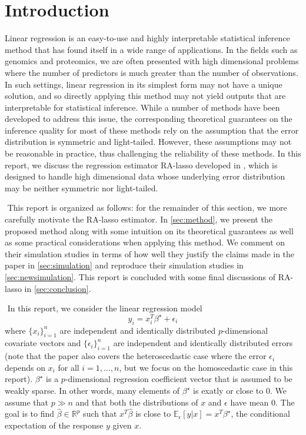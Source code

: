 

\section{Introduction}
Linear regression is an easy-to-use and highly interpretable statistical inference method that has found itself in a wide range of applications. In the fields such as genomics and proteomics, we are often presented with high dimensional problems where the number of predictors is much greater than the number of observations. In such settings, linear regression in its simplest form may not have a unique solution, and so directly applying this method may not yield outputs that are interpretable for statistical inference. While a number of methods have been developed to address this issue, the corresponding theoretical guarantees on the inference quality for most of these methods rely on the assumption that the error distribution is symmetric and light-tailed. However, these assumptions may not be reasonable in practice, thus challenging the reliability of these methods. In this report, we discuss the regression estimator RA-lasso developed in \citet{fan2017estimation}, which is designed to handle high dimensional data whose underlying error distribution may be neither symmetric nor light-tailed.

$ $\newline
This report is organized as follows: for the remainder of this section, we more carefully motivate the RA-lasso estimator. In \cref{sec:method}, we present the proposed method along with some intuition on its theoretical guarantees as well as some practical considerations when applying this method. We comment on their simulation studies in terms of how well they justify the claims made in the paper in \cref{sec:simulation} and reproduce their simulation studies in \cref{sec:newsimulation}. This report is concluded with some final discussions of RA-lasso in \cref{sec:conclusion}.

$ $\newline
In this report, we consider the linear regression model
\[
y_i = x_i^T\beta^\star + \epsilon_i
\]
where $\{x_i\}_{i=1}^n$ are independent and identically distributed $p$-dimensional covariate vectors and $\{\epsilon_i\}_{i=1}^n$ are independent and identically distributed errors (note that the paper also covers the heteroscedastic case where the error $\epsilon_i$ depends on $x_i$ for all $i=1,\dots,n$, but we focus on the homoscedastic case in this report). $\beta^\star$ is a $p$-dimensional regression coefficient vector that is assumed to be weakly sparse. In other words, many elements of $\beta^\star$ is exatly or close to $0$. We assume that $p \gg n$ and that both the distributions of $x$ and $\epsilon$ have mean $0$. The goal is to find $\hat{\beta}\in\mathbb{R}^p$ such that $x^T\hat{\beta}$ is close to $\mathbb{E}_{\epsilon}\left[ y | x \right] = x^T\beta^\star$, the conditional expectation of the response $y$ given $x$.

